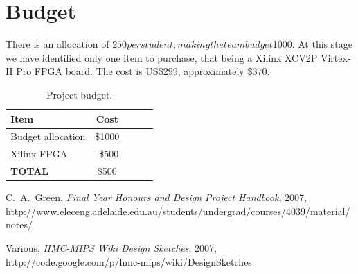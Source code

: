 \documentclass[a4paper,12pt]{article}
\begin{document}
\section{Budget}

There is an allocation of $250 per student, making the team budget
$1000. At this stage we have identified only one item to purchase,
that being a Xilinx XCV2P Virtex-II Pro FPGA board. The cost is
US\$299, approximately \$370. 

\begin{table}[h]
\begin{tabular}{|l|c|c|c|c|}
  \hline
  \textbf{Item} & \textbf{Cost} \\
  \hline
  \hline
  Budget allocation & \$1000 \\
  \hline
  Xilinx FPGA & -\$500 \\
  \hline
  \hline
  \textbf{TOTAL} & \$500 \\
  \hline
\end{tabular}
\caption{Project budget. }
 \label{budget}
\end{table}

\begin{thebibliography}{99}

 C.~A.~Green, \emph{Final Year Honours and Design
  Project Handbook}, 2007, http://www.eleceng.adelaide.edu.au/students/undergrad/courses/4039/material/notes/

 Various, \emph{HMC-MIPS Wiki Design Sketches},
2007, http://code.google.com/p/hmc-mips/wiki/DesignSketches

\end{thebibliography}

%
%
\end{document}
